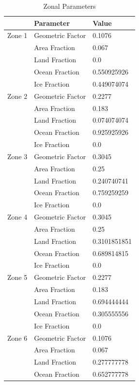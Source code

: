 \documentclass[12pt]{article}
\begin{document}
\begin{table}[H]
    \parbox{.45\linewidth}{
    \captionsetup{singlelinecheck = false, justification=justified}
    \caption{Zonal Parameters}
    \begin{tabular}{lll}
    \hline
     & Parameter & Value \\
    \hline
    Zone 1 & Geometric Factor & 0.1076 \\
     & Area Fraction & 0.067 \\
     & Land Fraction & 0.0 \\
     & Ocean Fraction & 0.550925926 \\ 
     & Ice Fraction & 0.449074074 \\
    \hline
    Zone 2 & Geometric Factor & 0.2277 \\
     & Area Fraction & 0.183 \\
     & Land Fraction & 0.074074074 \\
     & Ocean Fraction & 0.925925926 \\ 
     & Ice Fraction & 0.0\\
    \hline
    Zone 3 & Geometric Factor & 0.3045 \\
     & Area Fraction & 0.25 \\
     & Land Fraction & 0.240740741 \\
     & Ocean Fraction & 0.759259259 \\ 
     & Ice Fraction & 0.0\\
    \hline
    Zone 4 & Geometric Factor & 0.3045 \\
     & Area Fraction & 0.25 \\
     & Land Fraction & 0.3101851851 \\
     & Ocean Fraction & 0.689814815 \\ 
     & Ice Fraction & 0.0\\
    \hline
    Zone 5 & Geometric Factor & 0.2277 \\
     & Area Fraction & 0.183 \\
     & Land Fraction & 0.694444444 \\
     & Ocean Fraction & 0.305555556 \\ 
     & Ice Fraction & 0.0\\
    \hline
    Zone 6 & Geometric Factor & 0.1076 \\
     & Area Fraction & 0.067 \\
     & Land Fraction & 0.277777778 \\
     & Ocean Fraction & 0.652777778 \\ 

\end{tabular}}
\end{table}
\end{document}
